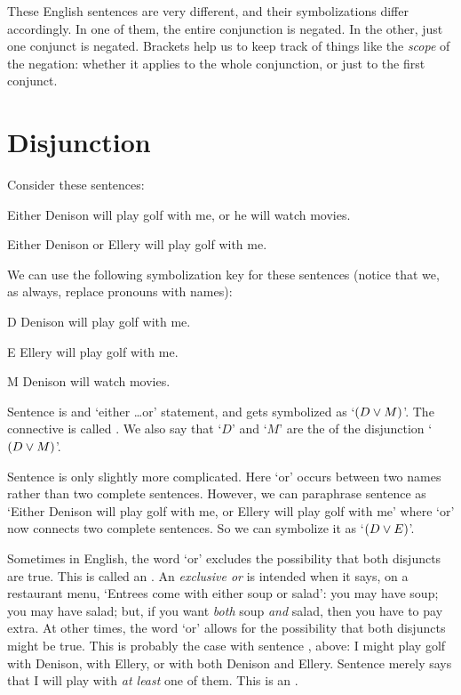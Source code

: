 These English sentences are very different, and their symbolizations differ accordingly. In one of them, the entire conjunction is negated. In the other, just one conjunct is negated. Brackets help us to keep track of things like the \emph{scope} of the negation: whether it applies to the whole conjunction, or just to the first conjunct. 

\section{Disjunction}\label{s:Disjunction}
Consider these sentences:
	\begin{earg}
		\item[\ex{or1}]Either Denison will play golf with me, or he will watch movies.
		\item[\ex{or2}]Either Denison or Ellery will play golf with me. 
	\end{earg}
We can use the following symbolization key for these sentences (notice that we, as always, replace pronouns with names):
	\begin{ekey}
		\item[D] Denison will play golf with me.
		\item[E] Ellery will play golf with me.
		\item[M] Denison will watch movies.
	\end{ekey}
Sentence  is and `either \ldots or' statement, and gets symbolized as `$(D \vee M)$'. The connective is called . We also say that `$D$' and `$M$' are the  of the disjunction `$(D \vee M)$'.

Sentence  is only slightly more complicated.  Here `or' occurs between two names rather than two complete sentences. However, we can paraphrase sentence  as `Either Denison will play golf with me, or Ellery will play golf with me' where `or' now connects two complete sentences. So we can symbolize it as `$(D \vee E)$'.
	
	
Sometimes in English, the word `or' excludes the possibility that both disjuncts are true. This is called an .  An \emph{exclusive or} is  intended when it says, on a restaurant menu, `Entrees come with either soup or salad': you may have soup; you may have salad; but, if you want \emph{both} soup \emph{and} salad, then you have to pay extra.  At other times, the word `or' allows for the possibility that both disjuncts might be true. This is probably the case with sentence , above: I might play golf with Denison, with Ellery, or with both Denison and Ellery. Sentence  merely says that I will play with \emph{at least} one of them. This is an . 

